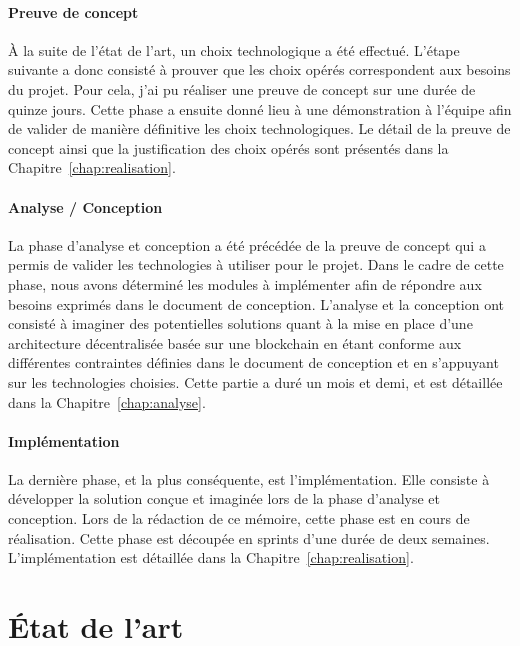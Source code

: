 \documentclass{tnreport}
\begin{document}
\subsubsection{Preuve de concept}

À la suite de l'état de l'art, un choix technologique a été effectué. L'étape suivante a donc consisté à prouver que les choix opérés correspondent aux besoins du projet. Pour cela, j'ai pu réaliser une preuve de concept sur une durée de quinze jours. Cette phase a ensuite donné lieu à une démonstration à l'équipe afin de valider de manière définitive les choix technologiques. Le détail de la preuve de concept ainsi que la justification des choix opérés sont présentés dans la Chapitre~\ref{chap:realisation}.

\subsubsection{Analyse / Conception}

La phase d'analyse et conception a été précédée de la preuve de concept qui a permis de valider les technologies à utiliser pour le projet. Dans le cadre de cette phase, nous avons déterminé les modules à implémenter afin de répondre aux besoins exprimés dans le document de conception. L'analyse et la conception ont consisté à imaginer des potentielles solutions quant à la mise en place d'une architecture décentralisée basée sur une blockchain en étant conforme aux différentes contraintes définies dans le document de conception et en s'appuyant sur les technologies choisies. Cette partie a duré un mois et demi, et est détaillée dans la Chapitre~\ref{chap:analyse}.

\subsubsection{Implémentation}

La dernière phase, et la plus conséquente, est l'implémentation. Elle consiste à développer la solution conçue et imaginée lors de la phase d'analyse et conception. Lors de la rédaction de ce mémoire, cette phase est en cours de réalisation. Cette phase est découpée en sprints d'une durée de deux semaines. L'implémentation est détaillée dans la Chapitre~\ref{chap:realisation}. 

\chapter{État de l'art}
\label{chap:state-of-the-art}
\end{document}
